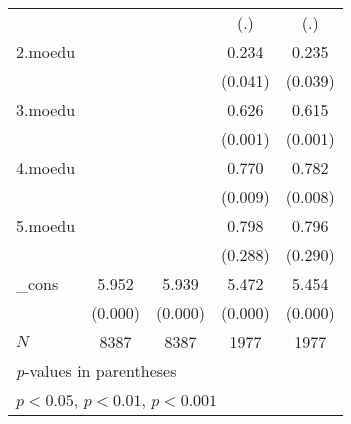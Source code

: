 {\begin{tabular}{l*{4}{c}}
            &                     &                     &         (.)         &         (.)         \\
[1em]
2.moedu     &                     &                     &       0.234\sym{*}  &       0.235\sym{*}  \\
            &                     &                     &     (0.041)         &     (0.039)         \\
[1em]
3.moedu     &                     &                     &       0.626\sym{***}&       0.615\sym{***}\\
            &                     &                     &     (0.001)         &     (0.001)         \\
[1em]
4.moedu     &                     &                     &       0.770\sym{**} &       0.782\sym{**} \\
            &                     &                     &     (0.009)         &     (0.008)         \\
[1em]
5.moedu     &                     &                     &       0.798         &       0.796         \\
            &                     &                     &     (0.288)         &     (0.290)         \\
[1em]
\_cons      &       5.952\sym{***}&       5.939\sym{***}&       5.472\sym{***}&       5.454\sym{***}\\
            &     (0.000)         &     (0.000)         &     (0.000)         &     (0.000)         \\
\hline
\(N\)       &        8387         &        8387         &        1977         &        1977         \\
\hline\hline
\multicolumn{5}{l}{\footnotesize \textit{p}-values in parentheses}\\
\multicolumn{5}{l}{\footnotesize \sym{*} \(p<0.05\), \sym{**} \(p<0.01\), \sym{***} \(p<0.001\)}\\
\end{tabular}
}
